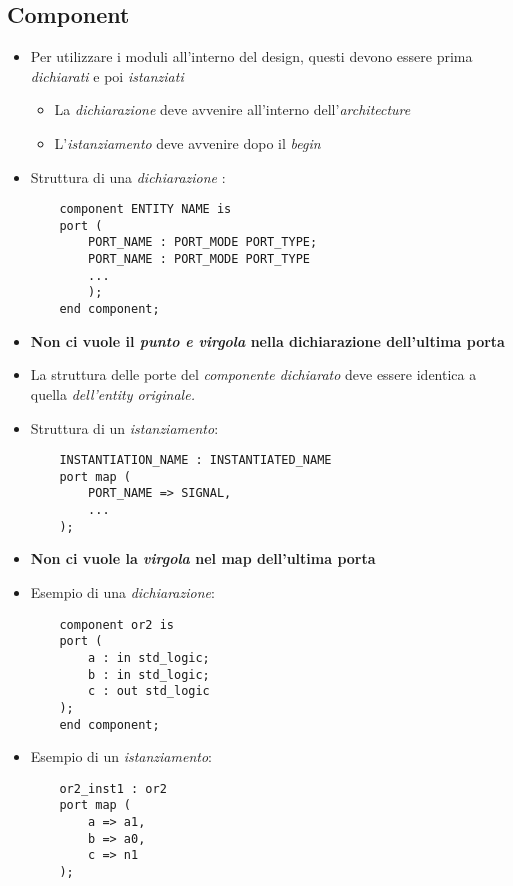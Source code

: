 \documentclass{article}
\begin{document}
\subsection{Component}
\begin{itemize}
  \item Per utilizzare i moduli all'interno del design, questi devono essere prima \textit{dichiarati} e poi \textit{istanziati}
        \begin{itemize}
          \item La \textit{dichiarazione} deve avvenire all'interno dell'\textit{architecture}
          \item L'\textit{istanziamento} deve avvenire dopo il \textit{begin}
        \end{itemize}
  \item Struttura di una \textit{dichiarazione} :
        \begin{verbatim}
    component ENTITY NAME is
    port (
        PORT_NAME : PORT_MODE PORT_TYPE;
        PORT_NAME : PORT_MODE PORT_TYPE
        ...
        );
    end component;
\end{verbatim}
  \item \textbf{Non ci vuole il \textit{punto e virgola} nella dichiarazione dell'ultima porta}
  \item La struttura delle porte del \textit{componente dichiarato} deve essere identica a quella \textit{dell'entity originale.}
  \item Struttura di un \textit{istanziamento}:
        \begin{verbatim}
    INSTANTIATION_NAME : INSTANTIATED_NAME
    port map (
        PORT_NAME => SIGNAL,
        ...
    );
\end{verbatim}
  \item \textbf{Non ci vuole la \textit{virgola} nel map dell'ultima porta}
  \item Esempio di una \textit{dichiarazione}:
        \begin{verbatim}
    component or2 is
    port (
        a : in std_logic;
        b : in std_logic;
        c : out std_logic
    );
    end component;
\end{verbatim}
  \item Esempio di un \textit{istanziamento}:
        \begin{verbatim}
    or2_inst1 : or2
    port map (
        a => a1,
        b => a0,
        c => n1
    );
\end{verbatim}
\end{itemize}
\end{document}
